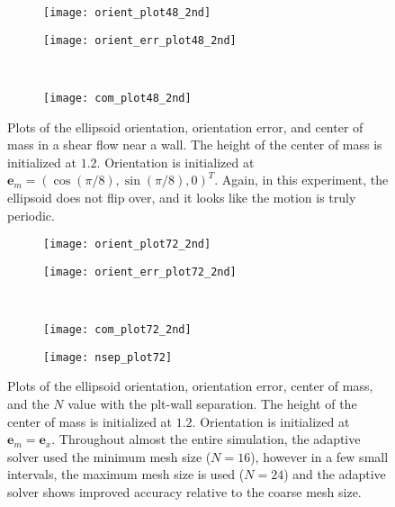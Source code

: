 \documentclass{article}
\newcommand{\vect}[1]{\boldsymbol{\mathbf{#1}}}
\begin{document}
\begin{figure}
  \centering
  \begin{subfigure}{0.49\textwidth}
    \texttt{[image: orient\_plot48\_2nd]}
  \end{subfigure}
  \hfill
  \begin{subfigure}{0.49\textwidth}
    \texttt{[image: orient\_err\_plot48\_2nd]}
  \end{subfigure}
  \\
  \begin{subfigure}{0.49\textwidth}
    \texttt{[image: com\_plot48\_2nd]}
  \end{subfigure}
  \caption{Plots of the ellipsoid orientation, orientation error, and
     center of mass in a shear flow near a wall. The height of the
     center of mass is initialized at $1.2$. Orientation is initialized
     at $\vect{e}_m = (\cos(\pi/8), \sin(\pi/8), 0)^T$. Again, in this
     experiment, the ellipsoid does not flip over, and it looks like
     the motion is truly periodic.}
  \label{fig:plt48}
\end{figure}

\begin{figure}
  \centering
  \begin{subfigure}{0.49\textwidth}
    \texttt{[image: orient\_plot72\_2nd]}
  \end{subfigure}
  \hfill
  \begin{subfigure}{0.49\textwidth}
    \texttt{[image: orient\_err\_plot72\_2nd]}
  \end{subfigure}
  \\
  \begin{subfigure}{0.49\textwidth}
    \texttt{[image: com\_plot72\_2nd]}
  \end{subfigure}
  \hfill
  \begin{subfigure}{0.49\textwidth}
    \texttt{[image: nsep\_plot72]}
  \end{subfigure}  
  \caption{Plots of the ellipsoid orientation, orientation error,
    center of mass, and the $N$ value with the plt-wall
    separation. The height of the center of mass is initialized at
    $1.2$. Orientation is initialized at $\vect{e}_m =
    \vect{e}_x$. Throughout almost the entire simulation, the adaptive
    solver used the minimum mesh size ($N = 16$), however in a few
    small intervals, the maximum mesh size is used ($N = 24$) and the
    adaptive solver shows improved accuracy relative to the coarse
    mesh size.} 
  \label{fig:plt72}
\end{figure}
\end{document}
